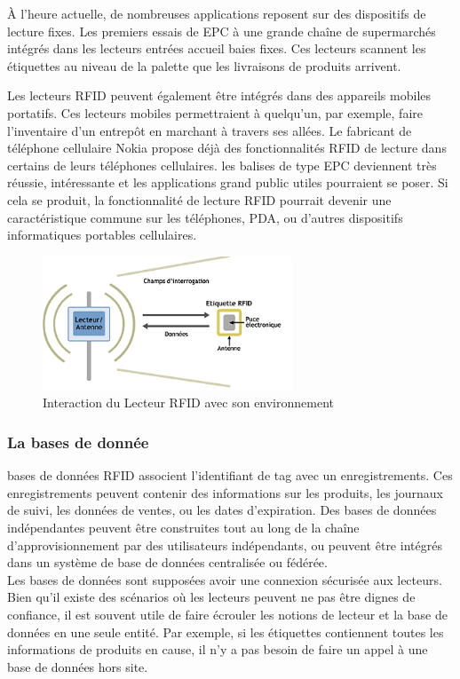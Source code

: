 \documentclass[11pt, a4paper, twoside]{book}
\begin{document}
À l'heure actuelle, de nombreuses applications reposent sur des dispositifs de lecture fixes. Les premiers essais de EPC à une grande chaîne de supermarchés intégrés dans les lecteurs entrées accueil baies fixes. Ces lecteurs scannent les étiquettes au niveau de la palette que les livraisons de produits arrivent. 

Les lecteurs RFID peuvent également être intégrés dans des appareils mobiles portatifs. Ces lecteurs mobiles permettraient à quelqu'un, par exemple, faire l'inventaire d'un entrepôt en marchant à travers ses allées. Le fabricant de téléphone cellulaire Nokia propose déjà des fonctionnalités RFID de lecture dans certains de leurs téléphones cellulaires. les balises de type EPC deviennent très réussie, intéressante et les applications grand public utiles pourraient se poser. Si cela se produit, la fonctionnalité de lecture RFID pourrait devenir une caractéristique commune sur les téléphones, PDA, ou d'autres dispositifs informatiques portables cellulaires.
\begin{figure}[H]
\centering
\includegraphics[height=4cm]{reader}
\caption{Interaction du Lecteur RFID avec son environnement}
\end{figure}
\subsubsection{La bases de donnée}
bases de données RFID associent l'identifiant de tag avec un enregistrements. Ces enregistrements peuvent contenir des informations sur les produits, les journaux de suivi, les données de ventes, ou les dates d'expiration. Des bases de données indépendantes peuvent être construites tout au long de la chaîne d'approvisionnement par des utilisateurs indépendants, ou peuvent être intégrés dans un système de base de données centralisée ou fédérée.\\

Les bases de données sont supposées avoir une connexion sécurisée aux lecteurs. Bien qu'il existe des scénarios où les lecteurs peuvent ne pas être dignes de confiance, il est souvent utile de faire écrouler les notions de lecteur et la base de données en une seule entité. Par exemple, si les étiquettes contiennent toutes les informations de produits en cause, il n'y a pas besoin de faire un appel à une base de données hors site.
\end{document}
